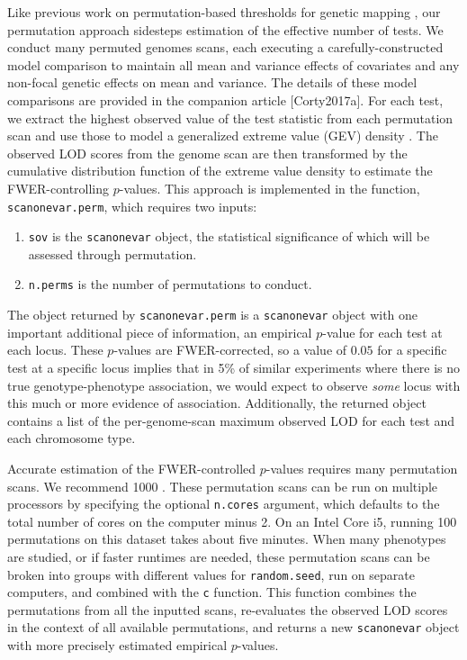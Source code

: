 \documentclass{article}
\begin{document}
Like previous work on permutation-based thresholds for genetic mapping \citep{Churchill1994,Carlborg2002}, our permutation approach sidesteps estimation of the effective number of tests.
We conduct many permuted genomes scans, each executing a carefully-constructed model comparison to maintain all mean and variance effects of covariates and any non-focal genetic effects on mean and variance.
The details of these model comparisons are provided in the companion article [Corty2017a].
For each test, we extract the highest observed value of the test statistic from each permutation scan and use those to model a generalized extreme value (GEV) density \citep{Stephenson2002}.
The observed LOD scores from the genome scan are then transformed by the cumulative distribution function of the extreme value density to estimate the FWER-controlling $p$-values.
This approach is implemented in the function, \texttt{scanonevar.perm}, which requires two inputs:

\begin{enumerate}
	\item \texttt{sov} is the \texttt{scanonevar} object, the statistical significance of which will be assessed through permutation.
	\item \texttt{n.perms} is the number of permutations to conduct.
\end{enumerate}

The object returned by \texttt{scanonevar.perm} is a \texttt{scanonevar} object with one important additional piece of information, an empirical $p$-value for each test at each locus.
These $p$-values are FWER-corrected, so a value of $0.05$ for a specific test at a specific locus implies that in 5\% of similar experiments where there is no true genotype-phenotype association, we would expect to observe \textit{some} locus with this much or more evidence of association.
Additionally, the returned object contains a list of the per-genome-scan maximum observed LOD for each test and each chromosome type.

Accurate estimation of the FWER-controlled $p$-values requires many permutation scans.
We recommend 1000 \citep{Churchill1994,Carlborg2002}.
These permutation scans can be run on multiple processors by specifying the optional \texttt{n.cores} argument, which defaults to the total number of cores on the computer minus 2.
On an Intel Core i5, running 100 permutations on this dataset takes about five minutes.
When many phenotypes are studied, or if faster runtimes are needed, these permutation scans can be broken into groups with different values for \texttt{random.seed}, run on separate computers, and combined with the \texttt{c} function.
This function combines the permutations from all the inputted scans, re-evaluates the observed LOD scores in the context of all available permutations, and returns a new \texttt{scanonevar} object with more precisely estimated empirical $p$-values.
\end{document}
